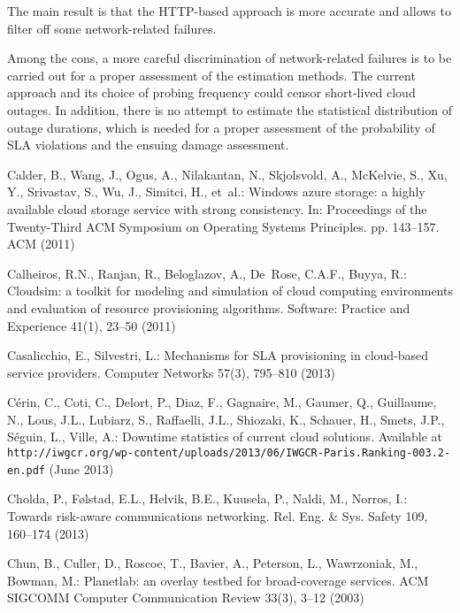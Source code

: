 \documentclass[runningheads,a4paper]{llncs}
\begin{document}
The main result is that the HTTP-based approach is more accurate and allows to filter off some network-related failures.

Among the cons, a more careful discrimination of network-related failures is to be carried out for a proper assessment of the estimation methods. The current approach and its choice of probing frequency could censor short-lived cloud outages. In addition, there is no attempt to estimate the statistical distribution of outage durations, which is needed for a proper assessment of the probability of SLA violations and the ensuing damage assessment.






\begin{thebibliography}{10}
\providecommand{\url}[1]{\texttt{#1}}
\providecommand{\urlprefix}{URL }

Calder, B., Wang, J., Ogus, A., Nilakantan, N., Skjolsvold, A., McKelvie, S.,
  Xu, Y., Srivastav, S., Wu, J., Simitci, H., et~al.: Windows azure storage: a
  highly available cloud storage service with strong consistency. In:
  Proceedings of the Twenty-Third ACM Symposium on Operating Systems
  Principles. pp. 143--157. ACM (2011)

Calheiros, R.N., Ranjan, R., Beloglazov, A., De~Rose, C.A.F., Buyya, R.:
  Cloudsim: a toolkit for modeling and simulation of cloud computing
  environments and evaluation of resource provisioning algorithms. Software:
  Practice and Experience  41(1),  23--50 (2011)

Casalicchio, E., Silvestri, L.: Mechanisms for {SLA} provisioning in
  cloud-based service providers. Computer Networks  57(3),  795--810 (2013)

C\'{e}rin, C., Coti, C., Delort, P., Diaz, F., Gagnaire, M., Gaumer, Q.,
  Guillaume, N., Lous, J.L., Lubiarz, S., Raffaelli, J.L., Shiozaki, K.,
  Schauer, H., Smets, J.P., S\'{e}guin, L., Ville, A.: Downtime statistics of
  current cloud solutions. Available at
  \url{http://iwgcr.org/wp-content/uploads/2013/06/IWGCR-Paris.Ranking-003.2-en.pdf}
  (June 2013)

Cholda, P., F{\o}lstad, E.L., Helvik, B.E., Kuusela, P., Naldi, M., Norros, I.:
  Towards risk-aware communications networking. Rel. Eng. {\&} Sys. Safety
  109,  160--174 (2013)

Chun, B., Culler, D., Roscoe, T., Bavier, A., Peterson, L., Wawrzoniak, M.,
  Bowman, M.: Planetlab: an overlay testbed for broad-coverage services. ACM
  SIGCOMM Computer Communication Review  33(3),  3--12 (2003)


\end{thebibliography}
\end{document}
